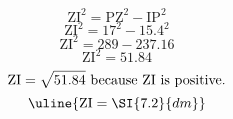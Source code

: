 \[\text{ZI}^{2}=\text{PZ}^{2}-\text{IP}^{2}\]
\[\text{ZI}^{2}=17^{2}-15.4^{2}\]
\[\text{ZI}^{2}=289-237.16\]
\[\text{ZI}^{2}=51.84\]
\[\text{ZI}=\sqrt{\mathstrut 51.84}\text{ because ZI is positive.}\]
\[\uline{\text{ZI}=\SI{7.2}{dm}}\]
